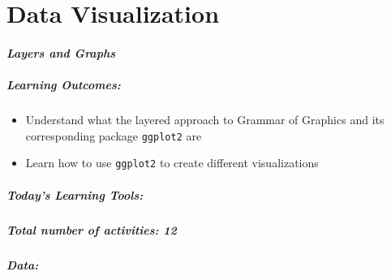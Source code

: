 \documentclass[
]{book}
\providecommand{\tightlist}{%
  \setlength{\itemsep}{0pt}\setlength{\parskip}{0pt}}
\begin{document}
\hypertarget{data-visualization}{%
\chapter{Data Visualization}\label{data-visualization}}

\hypertarget{layers-and-graphs}{%
\subsubsection*{\texorpdfstring{\emph{Layers and Graphs}}{Layers and Graphs}}\label{layers-and-graphs}}

\hypertarget{learning-outcomes-2}{%
\paragraph*{\texorpdfstring{\textbf{Learning Outcomes:}}{Learning Outcomes:}}\label{learning-outcomes-2}}

\begin{itemize}
\tightlist
\item
  Understand what the layered approach to Grammar of Graphics and its corresponding package \texttt{ggplot2} are
\item
  Learn how to use \texttt{ggplot2} to create different visualizations
\end{itemize}

\hypertarget{todays-learning-tools-2}{%
\paragraph*{\texorpdfstring{\textbf{Today's Learning Tools:}}{Today's Learning Tools:}}\label{todays-learning-tools-2}}

\hypertarget{total-number-of-activities-12}{%
\paragraph*{\texorpdfstring{\emph{Total number of activities}: 12}{Total number of activities: 12}}\label{total-number-of-activities-12}}

\hypertarget{data-2}{%
\paragraph*{\texorpdfstring{\emph{Data:}}{Data:}}\label{data-2}}
\end{document}
